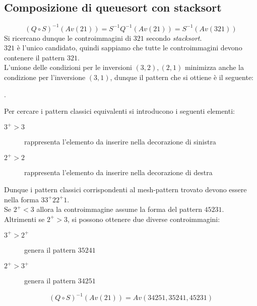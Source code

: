 \subsection{Composizione  di {queuesort} con {stacksort}}
$$(Q\circ S)^{-1}(Av(21))=S^{-1}Q^{-1}(Av(21))=S^{-1}(Av(321))$$
Si ricercano dunque le controimmagini di $321$ secondo \textit{stacksort}.\\$321$ \`e l'unico candidato, quindi sappiamo che tutte le controimmagini devono contenere il pattern $321$.\\
L'unione delle condizioni per le inversioni $(3,2),(2,1)$ minimizza anche la condizione per l'inversione $(3,1)$, dunque il pattern che si ottiene \`e il seguente:
\begin{center}
.
\end{center}
Per cercare i pattern classici equivalenti si introducono i seguenti elementi:
\begin{description}
	\item[$3^+>3$] rappresenta l'elemento da inserire nella decorazione di sinistra
	\item[$2^+>2$] rappresenta l'elemento da inserire nella decorazione di destra
\end{description}
Dunque i pattern classici corrispondenti al mesh-pattern trovato devono essere nella forma $33^+22^+1$.\\
Se $2^+<3$ allora la controimmagine assume la forma del pattern $45231$.\\
Altrimenti se $2^+>3$, si possono ottenere due diverse controimmagini:
\begin{description}
	\item[$3^+>2^+$] genera il pattern $35241$
	\item[$2^+>3^+$] genera il pattern $34251$
\end{description}
$$(Q\circ S)^{-1}(Av(21)) = Av(34251, 35241, 45231)$$
